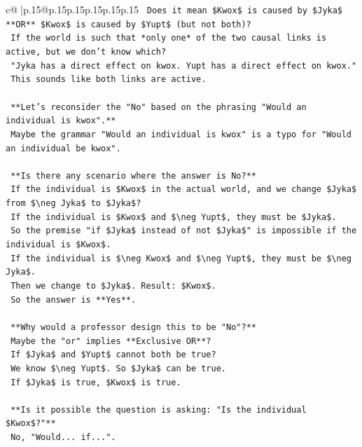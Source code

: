 \documentclass{article}
\begin{document}
{\begin{supertabular}{c@{$\;$}|p{.15\linewidth}@{}p{.15\linewidth}p{.15\linewidth}p{.15\linewidth}p{.15\linewidth}p{.15\linewidth}}
{{{\texttt{    Does it mean \$Kwox\$ is caused by \$Jyka\$ **OR** \$Kwox\$ is caused by \$Yupt\$ (but not both)?} \\
\texttt{    If the world is such that *only one* of the two causal links is active, but we don't know which?} \\
\texttt{    "Jyka has a direct effect on kwox. Yupt has a direct effect on kwox."} \\
\texttt{    This sounds like both links are active.} \\
\\ 
\texttt{    **Let's reconsider the "No" based on the phrasing "Would an individual is kwox".**} \\
\texttt{    Maybe the grammar "Would an individual is kwox" is a typo for "Would an individual be kwox".} \\
\\ 
\texttt{    **Is there any scenario where the answer is No?**} \\
\texttt{    If the individual is \$Kwox\$ in the actual world, and we change \$Jyka\$ from \$\textbackslash{}neg Jyka\$ to \$Jyka\$?} \\
\texttt{    If the individual is \$Kwox\$ and \$\textbackslash{}neg Yupt\$, they must be \$Jyka\$.} \\
\texttt{    So the premise "if \$Jyka\$ instead of not \$Jyka\$" is impossible if the individual is \$Kwox\$.} \\
\texttt{    If the individual is \$\textbackslash{}neg Kwox\$ and \$\textbackslash{}neg Yupt\$, they must be \$\textbackslash{}neg Jyka\$.} \\
\texttt{    Then we change to \$Jyka\$. Result: \$Kwox\$.} \\
\texttt{    So the answer is **Yes**.} \\
\\ 
\texttt{    **Why would a professor design this to be "No"?**} \\
\texttt{    Maybe the "or" implies **Exclusive OR**?} \\
\texttt{    If \$Jyka\$ and \$Yupt\$ cannot both be true?} \\
\texttt{    We know \$\textbackslash{}neg Yupt\$. So \$Jyka\$ can be true.} \\
\texttt{    If \$Jyka\$ is true, \$Kwox\$ is true.} \\
\\ 
\texttt{    **Is it possible the question is asking: "Is the individual \$Kwox\$?"**} \\
\texttt{    No, "Would... if...".} \\
}}}
\end{supertabular}}
\end{document}
